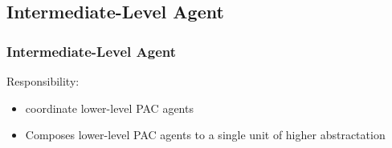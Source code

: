 \documentclass{beamer}
\begin{document}
\subsection{Intermediate-Level Agent}


\begin{frame}
 \frametitle{Intermediate-Level Agent}
 
 Responsibility:
 
 \begin{itemize}
  \item coordinate lower-level PAC agents
  \item Composes lower-level PAC agents to a single unit of higher abstractation
 \end{itemize}
 

\end{frame}
\end{document}
